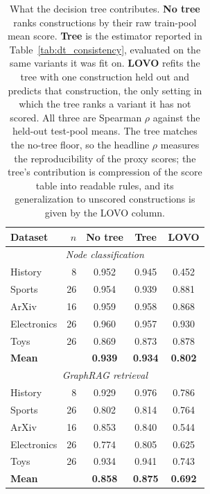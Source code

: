 \begin{table}[htbp]
\centering
\small
\caption{What the decision tree contributes. \textbf{No tree} ranks constructions
by their raw train-pool mean score. \textbf{Tree} is the estimator reported in
Table~\ref{tab:dt_consistency}, evaluated on the same variants it was fit on.
\textbf{LOVO} refits the tree with one construction held out and predicts that
construction, the only setting in which the tree ranks a variant it has not
scored. All three are Spearman $\rho$ against the held-out test-pool means. The
tree matches the no-tree floor, so the headline $\rho$ measures the
reproducibility of the proxy scores; the tree's contribution is compression of
the score table into readable rules, and its generalization to unscored
constructions is given by the LOVO column.}
\label{tab:tree_ablation}
\vspace{4pt}
\begin{tabular}{lrccc}
\toprule
Dataset & $n$ & No tree & Tree & LOVO \\
\midrule
\multicolumn{5}{c}{\textit{Node classification}} \\
\midrule
History & 8 & 0.952 & 0.945 & 0.452 \\
Sports & 26 & 0.954 & 0.939 & 0.881 \\
ArXiv & 16 & 0.959 & 0.958 & 0.868 \\
Electronics & 26 & 0.960 & 0.957 & 0.930 \\
Toys & 26 & 0.869 & 0.873 & 0.878 \\
\textbf{Mean} & & \textbf{0.939} & \textbf{0.934} & \textbf{0.802} \\
\midrule
\multicolumn{5}{c}{\textit{GraphRAG retrieval}} \\
\midrule
History & 8 & 0.929 & 0.976 & 0.786 \\
Sports & 26 & 0.802 & 0.814 & 0.764 \\
ArXiv & 16 & 0.853 & 0.840 & 0.544 \\
Electronics & 26 & 0.774 & 0.805 & 0.625 \\
Toys & 26 & 0.934 & 0.941 & 0.743 \\
\textbf{Mean} & & \textbf{0.858} & \textbf{0.875} & \textbf{0.692} \\
\bottomrule
\end{tabular}
\end{table}
